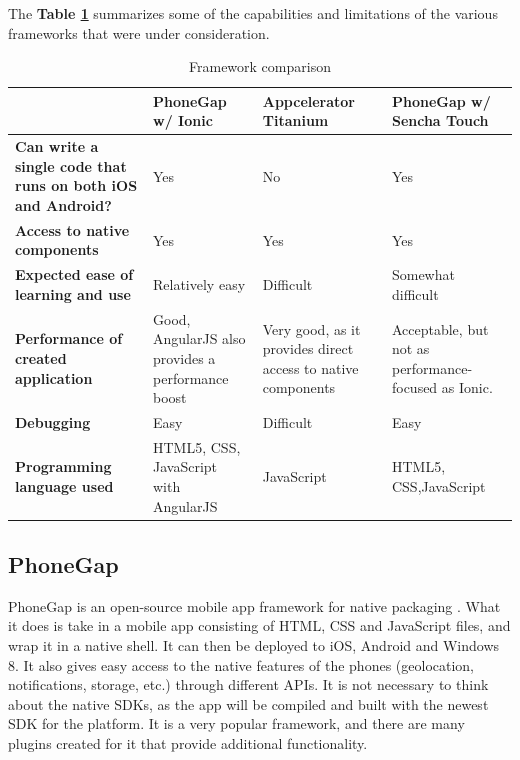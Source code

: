 The \textbf{Table \ref{Tab:framework}} summarizes some of the capabilities and limitations of the various frameworks that were under consideration.

\begin{table}[!h]
	\caption{Framework comparison}
		\begin{tabular}{ | p{6cm} | >{\raggedright}p{3cm} | >{\raggedright}p{3cm} | p{4cm} |}
			\hline
			\textbf{} & \textbf{PhoneGap w/ Ionic} & \textbf{Appcelerator Titanium} & \textbf{PhoneGap w/ Sencha Touch} \\ \hline
			\textbf{Can write a single code that runs on both iOS and Android?} & Yes & No & Yes \\ \hline
			\textbf{Access to native components} & Yes & Yes & Yes \\ \hline
			\textbf{Expected ease of learning and use} & Relatively easy & Difficult & Somewhat difficult \\ \hline
			\textbf{Performance of created application} & Good, AngularJS also provides a performance boost & Very good, as it provides direct access to native components & Acceptable, but not as performance- focused as Ionic. \\ \hline
			\textbf{Debugging} & Easy & Difficult & Easy \\ \hline
			\textbf{Programming language used} & HTML5, CSS, JavaScript with AngularJS & JavaScript & HTML5, CSS,\newline JavaScript \\ \hline
		\end{tabular}
	\label{Tab:framework}
\end{table}

\subsection{PhoneGap}
\label{subsec:phonegap}

PhoneGap is an open-source mobile app framework for native packaging \cite{RA2}. What it does is take in a mobile app consisting of HTML, CSS and JavaScript files, and wrap it in a native shell. It can then be deployed to iOS, Android and Windows 8. It also gives easy access to the native features of the phones (geolocation, notifications, storage, etc.) through different APIs. It is not necessary to think about the native SDKs, as the app will be compiled and built with the newest SDK for the platform.  It is a very popular framework, and there are many plugins created for it that provide additional functionality.

